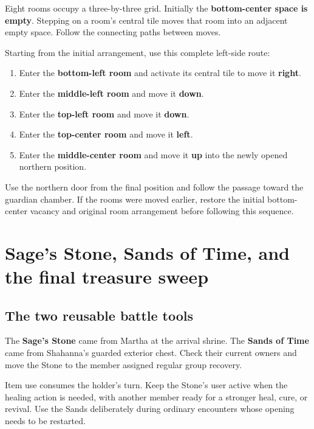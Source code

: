 Eight rooms occupy a three-by-three grid. Initially the
\textbf{bottom-center space is empty}. Stepping on a
room's central tile moves that room into an adjacent empty
space. Follow the connecting paths between moves.

Starting from the initial arrangement, use this complete
left-side route:
\begin{enumerate}
  \item Enter the \textbf{bottom-left room} and activate its
    central tile to move it \textbf{right}.
  \item Enter the \textbf{middle-left room} and move it
    \textbf{down}.
  \item Enter the \textbf{top-left room} and move it
    \textbf{down}.
  \item Enter the \textbf{top-center room} and move it
    \textbf{left}.
  \item Enter the \textbf{middle-center room} and move it
    \textbf{up} into the newly opened northern position.
\end{enumerate}

Use the northern door from the final position and follow
the passage toward the guardian chamber. If the rooms were
moved earlier, restore the initial bottom-center vacancy
and original room arrangement before following this sequence.


\section{Sage's Stone, Sands of Time, and the final treasure sweep}

\subsection*{The two reusable battle tools}

The \textbf{Sage's Stone} came from Martha at the arrival
shrine. The \textbf{Sands of Time} came from Shahanna's
guarded exterior chest. Check their current owners and
move the Stone to the member assigned regular group recovery.

Item use consumes the holder's turn. Keep the Stone's user
active when the healing action is needed, with another
member ready for a stronger heal, cure, or revival.
Use the Sands deliberately during ordinary encounters
whose opening needs to be restarted.

